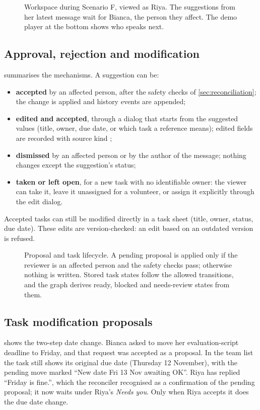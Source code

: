 \begin{figure}[t]
\centering
{}
\caption[Workspace during a demo story]{Workspace during Scenario F, viewed as Riya. The suggestions from her latest message wait for Bianca, the person they affect. The demo player at the bottom shows who speaks next.}
\label{fig:shotneeds}
\end{figure}

\subsection{Approval, rejection and modification}
 summarises the mechanisms. A suggestion can be:
\begin{itemize}
  \item \textbf{accepted} by an affected person, after the safety checks of \cref{sec:reconciliation}; the change is applied and history events are appended;
  \item \textbf{edited and accepted}, through a dialog that starts from the suggested values (title, owner, due date, or which task a reference means); edited fields are recorded with source kind ;
  \item \textbf{dismissed} by an affected person or by the author of the message; nothing changes except the suggestion's status;
  \item \textbf{taken or left open}, for a new task with no identifiable owner: the viewer can take it, leave it unassigned for a volunteer, or assign it explicitly through the edit dialog.
\end{itemize}
Accepted tasks can still be modified directly in a task sheet (title, owner, status, due date). These edits are version-checked: an edit based on an outdated version is refused.

\begin{figure}[t]
\centering
{}
\caption[Task lifecycle and safety]{Proposal and task lifecycle. A pending proposal is applied only if the reviewer is an affected person and the safety checks pass; otherwise nothing is written. Stored task states follow the allowed transitions, and the graph derives ready, blocked and needs-review states from them.}
\label{fig:lifecycle}
\end{figure}

\subsection{Task modification proposals}
 shows the two-step date change. Bianca asked to move her evaluation-script deadline to Friday, and that request was accepted as a proposal. In the team list the task still shows its original due date (Thursday 12 November), with the pending move marked ``New date Fri 13 Nov awaiting OK''. Riya has replied ``Friday is fine.'', which the reconciler recognised as a confirmation of the pending proposal; it now waits under Riya's \emph{Needs you}. Only when Riya accepts it does the due date change.

